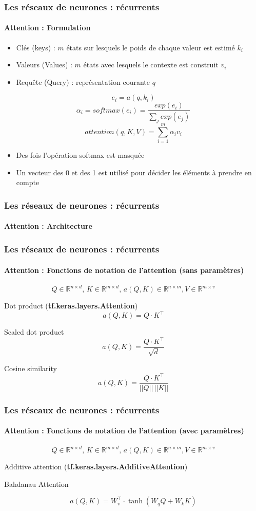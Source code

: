 \documentclass[xcolor=table]{beamer}
\begin{document}
\begin{frame}
	\frametitle{Les réseaux de neurones : récurrents}
	\framesubtitle{Attention : Formulation}
	
	\begin{itemize}
		\item Clés (keys) : $m$ états sur lesquels le poids de chaque valeur est estimé $k_i$
		\item Valeurs (Values) : $m$ états avec lesquels le contexte est construit $v_i$
		\item Requête (Query) : représentation courante $q$
	\end{itemize}
	
	\[e_i = a(q, k_i)\]
	\[\alpha_i = softmax(e_i) = \frac{exp(e_i)}{\sum_j exp(e_j)}\]
	\[attention(q, K, V) = \sum_{i=1}^{m} \alpha_i v_i\]
	
	\begin{itemize}
		\item Des fois l'opération softmax est masquée
		\item Un vecteur des 0 et des 1 est utilisé pour décider les éléments à prendre en compte
	\end{itemize}
	
\end{frame}

\begin{frame}
	\frametitle{Les réseaux de neurones : récurrents}
	\framesubtitle{Attention : Architecture}
	
	
\end{frame}


\begin{frame}
	\frametitle{Les réseaux de neurones : récurrents}
	\framesubtitle{Attention : Fonctions de notation de l'attention (sans paramètres)}
	
	\[Q \in \mathbb{R}^{n \times d}, \, K \in \mathbb{R}^{m \times d}, \, a(Q, K) \in \mathbb{R}^{n \times m}, V \in \mathbb{R}^{m \times v} \]
	
	Dot product (\textbf{tf.keras.layers.Attention})
	\[a(Q, K) = Q \cdot K^\top\]
	
	Scaled dot product 
	\[a(Q, K) = \frac{Q \cdot K^\top}{\sqrt{d}}\]
	
	Cosine similarity
	\[a(Q, K) = \frac{Q \cdot K^\top}{||Q|| \, ||K||}\]
	
\end{frame}

\begin{frame}
	\frametitle{Les réseaux de neurones : récurrents}
	\framesubtitle{Attention : Fonctions de notation de l'attention (avec paramètres)}
	
	\[Q \in \mathbb{R}^{n \times d}, \, K \in \mathbb{R}^{m \times d}, \, a(Q, K) \in \mathbb{R}^{n \times m}, V \in \mathbb{R}^{m \times v} \]
	
	Additive attention (\textbf{tf.keras.layers.AdditiveAttention})
	
	Bahdanau Attention
	
	\[a(Q, K) = W_v^\top \cdot \tanh(W_q Q + W_k K)\]
	
	
	
\end{frame}
\end{document}
